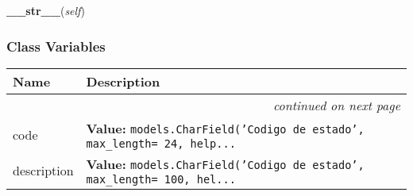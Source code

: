     \label{GroundSegment:models:SatelliteState:SatelliteState:__str__}

    \vspace{0.5ex}

\hspace{.8\funcindent}\begin{boxedminipage}{\funcwidth}

    \raggedright \textbf{\_\_str\_\_}(\textit{self})

\setlength{\parskip}{2ex}
\setlength{\parskip}{1ex}
    \end{boxedminipage}



  \subsubsection{Class Variables}

    \vspace{-1cm}
\hspace{\varindent}\begin{longtable}{|p{\varnamewidth}|p{\vardescrwidth}|l}
\cline{1-2}
\cline{1-2} \centering \textbf{Name} & \centering \textbf{Description}& \\
\cline{1-2}
\endhead\cline{1-2}\multicolumn{3}{r}{\small\textit{continued on next page}}\\\endfoot\cline{1-2}
\endlastfoot\raggedright c\-o\-d\-e\- & \raggedright \textbf{Value:} 
{\tt models.CharField('Codigo de estado', max\_length= 24, help\texttt{...}}&\\
\cline{1-2}
\raggedright d\-e\-s\-c\-r\-i\-p\-t\-i\-o\-n\- & \raggedright \textbf{Value:} 
{\tt models.CharField('Codigo de estado', max\_length= 100, hel\texttt{...}}&\\
\cline{1-2}
\end{longtable}

